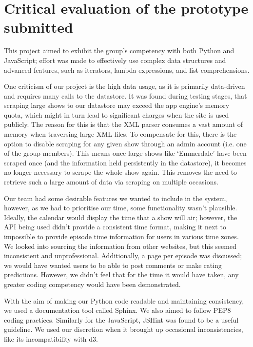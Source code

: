 \documentclass[12pt, a4paper]{article}
\begin{document}
\newpage	
\section{Critical evaluation of the prototype submitted}

This project aimed to exhibit the group's competency with both Python and JavaScript; effort was made to effectively use complex data structures and advanced features, such as iterators, lambda expressions, and list comprehensions.

One criticism of our project is the high data usage, as it is primarily data-driven and requires many calls to the datastore. It was found during testing stages, that scraping large shows to our datastore may exceed the app engine's memory quota, which might in turn lead to significant charges when the site is used publicly. The reason for this is that the XML parser consumes a vast amount of memory when traversing large XML files. To compensate for this, there is the option to disable scraping for any given show through an admin account (i.e. one of the group members). This means once large shows like `Emmerdale' have been scraped once (and the information held persistently in the datastore), it becomes no longer necessary to scrape the whole show again. This removes the need to retrieve such a large amount of data via scraping on multiple occasions.

Our team had some desirable features we wanted to include in the system, however, as we had to prioritise our time, some functionality wasn't plausible. Ideally, the calendar would display the time that a show will air; however, the API being used didn't provide a consistent time format, making it next to impossible to provide episode time information for users in various time zones. We looked into sourcing the information from other websites, but this seemed inconsistent and unprofessional. Additionally, a page per episode was discussed; we would have wanted users to be able to post comments or make rating predictions. However, we didn't feel that for the time it would have taken, any greater coding competency would have been demonstrated. 

With the aim of making our Python code readable and maintaining consistency, we used a documentation tool called Sphinx. We also aimed to follow PEP8 coding practices. Similarly for the JavaScript, JSHint was found to be a useful guideline. We used our discretion when it brought up occasional inconsistencies, like its incompatibility with d3.
\end{document}
